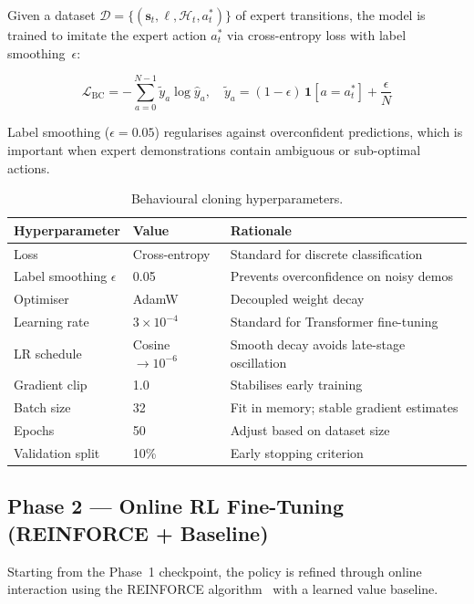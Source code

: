 \documentclass[12pt, a4paper]{article}
\begin{document}
Given a dataset $\mathcal{D} = \{(\mathbf{s}_t, \ell, \mathcal{H}_t,
a_t^*)\}$ of expert transitions, the model is trained to imitate the expert
action $a_t^*$ via cross-entropy loss with label smoothing~$\epsilon$:

\[
  \mathcal{L}_\text{BC} = -\sum_{a=0}^{N-1}
    \tilde{y}_a \log \hat{y}_a,
  \quad
  \tilde{y}_a = (1-\epsilon)\,\mathbf{1}[a = a_t^*] + \frac{\epsilon}{N}
\]

Label smoothing ($\epsilon = 0.05$) regularises against overconfident
predictions, which is important when expert demonstrations contain
ambiguous or sub-optimal actions.

\begin{table}[h]
\centering
\caption{Behavioural cloning hyperparameters.}
\begin{tabular}{L{5cm} L{3cm} L{5cm}}
\toprule
\textbf{Hyperparameter} & \textbf{Value} & \textbf{Rationale} \\
\midrule
Loss                & Cross-entropy   & Standard for discrete classification \\
Label smoothing $\epsilon$ & 0.05    & Prevents overconfidence on noisy demos \\
Optimiser           & AdamW           & Decoupled weight decay \\
Learning rate       & $3{\times}10^{-4}$ & Standard for Transformer fine-tuning \\
LR schedule         & Cosine $\to 10^{-6}$ & Smooth decay avoids late-stage oscillation \\
Gradient clip       & 1.0             & Stabilises early training \\
Batch size          & 32              & Fit in memory; stable gradient estimates \\
Epochs              & 50              & Adjust based on dataset size \\
Validation split    & 10\%            & Early stopping criterion \\
\bottomrule
\end{tabular}
\end{table}

\subsection{Phase 2 — Online RL Fine-Tuning (REINFORCE + Baseline)}

Starting from the Phase~1 checkpoint, the policy is refined through online
interaction using the REINFORCE algorithm~\cite{williams1992reinforce} with
a learned value baseline.
\end{document}
